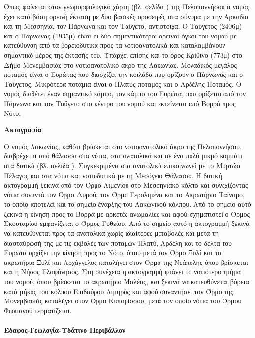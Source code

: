 \documentclass[12pt]{article}
\begin{document}
	Όπως φαίνεται στον γεωμορφολογικό χάρτη (βλ. σελίδα \pageref{peloponnese}) της Πελοποννήσου ο νομός έχει κατά βάση ορεινή έκταση με δυο βασικές οροσειρές στα σύνορα με την Αρκαδία και τη Μεσσηνία, τον Πάρνωνα και τον Ταΰγετο, αντίστοιχα. Ο Ταΰγετος (2406μ) και ο Πάρνωνας (1935μ) είναι οι δύο σημαντικότεροι ορεινοί όγκοι του νομού  με κατεύθυνση από τα βορειοδυτικά προς τα νοτιοανατολικά και καταλαμβάνουν σημαντικό μέρος της έκτασής του. Υπάρχει επίσης και το όρος Κρίθινο (773μ) στο Δήμο Μονεμβασιάς στο νοτιοανατολικό άκρο της Λακωνίας. Μοναδικός μεγάλος ποταμός είναι ο Ευρώτας που διασχίζει την κοιλάδα που ορίζουν ο Πάρνωνας και ο Ταΰγετος. Μικρότερα ποτάμια είναι ο Πλατύς ποταμός και ο Αρδέλης Ποταμός. Ο νομός διαθέτει έναν σημαντικό κάμπο, τον κάμπο του Ευρώτα, που ορίζεται από τον Πάρνωνα και τον Ταΰγετο στο κέντρο του νομού και εκτείνεται από Βορρά προς Νότο. 
	
	\textbf{Ακτογραφία}
	
	Ο νομός Λακωνίας, καθότι βρίσκεται στο νοτιοανατολικό άκρο της Πελοποννήσου, διαβρέχεται από θάλασσα στα νότια, στα ανατολικά και σε ένα πολύ μικρό κομμάτι στα δυτικά (βλ. σελίδα \pageref{peloponnese}). Συγκεκριμένα στα ανατολικά επικοινωνεί με το Μυρτώο Πέλαγος και στα νότια και νοτιοδυτικά με τη Μεσόγειο Θάλασσα. Η δυτική ακτογραμμή ξεκινά από τον Όρμο Λιμενίου στο Μεσσηνιακό κόλπο και συνεχίζοντας νότια συναντά τον Όρμο Δυρού, τον Όρμο Γερολιμένα και το Ακρωτήριο Ταίναρο, το οποίο αποτελεί και το σημείο έναρξης του Λακωνικού κόλπου. Από το σημείο αυτό ξεκινά η κίνηση προς το Βορρά με αρκετές ανωμαλίες και αφού σχηματιστεί ο Όρμος Σκουταρίου εμφανίζεται ο Όρμος Γυθείου. Από το σημείο αυτό η ακτογραμμή ξεκινά να κατευθύνεται προς τα ανατολικά χωρίς ιδιαίτερες μεταβολές και μετά τη διασταύρωσή της με τις εκβολές των ποταμών Πλατύ, Αρδέλη και το δέλτα του Ευρώτα αρχίζει την κίνηση προς το Νότο, όπου μετά τον Όρμο Ξυλί και τα ακρωτήρια Ξυλί και Αρχάγγελος καταλήγει στον Όρμο της Νεάπολης όπου βρίσκεται και η Νήσος Ελαφόνησος. Στη συνέχεια η ακτογραμμή φτάνει το νοτιότερο τμήμα του νομού, όπου βρίσκεται το ακρωτήριο Μαλέας, και ξεκινά να κατευθύνεται βόρεια κατά μήκος του κόλπου Επιδαύρου Λιμηράς και αφού συναντήσει τον Όρμο της Μονεμβασιάς καταλήγει στον Όρμο Κυπαρίσσου, μετά τον οποίο νότια του Όρμου Φωκιανού τερματίζεται. 
	
	\paragraph{Έδαφος-Γεωλογία-Υδάτινο Περιβάλλον}
	
\end{document}
